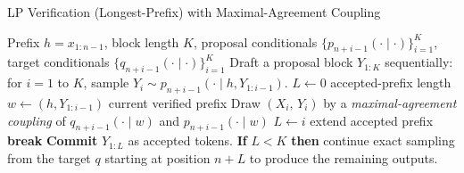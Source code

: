 \begin{algorithm}[t]
\caption{LP Verification (Longest-Prefix) with Maximal-Agreement Coupling}
\label{alg:lp-verification}
\begin{algorithmic}[1]
\Require Prefix $h=x_{1:n-1}$, block length $K$, proposal conditionals $\{p_{n+i-1}(\cdot\mid \cdot)\}_{i=1}^K$, target conditionals $\{q_{n+i-1}(\cdot\mid \cdot)\}_{i=1}^K$
\State Draft a proposal block $Y_{1:K}$ sequentially: for $i=1$ to $K$, sample $Y_i\sim p_{n+i-1}(\cdot\mid h, Y_{1:i-1})$.
\State $L\gets 0$ \Comment accepted-prefix length
  \State $w\gets (h, Y_{1:i-1})$ \Comment current verified prefix
  \State Draw $(X_i,\,Y_i)$ by a \emph{maximal-agreement coupling} of $q_{n+i-1}(\cdot\mid w)$ and $p_{n+i-1}(\cdot\mid w)$
     \State $L\gets i$ \Comment extend accepted prefix
  \Else
     \State \textbf{break}
  \EndIf
\EndFor
\State \textbf{Commit} $Y_{1:L}$ as accepted tokens.
\State \textbf{If} $L<K$ \textbf{then} continue exact sampling from the target $q$ starting at position $n+L$ to produce the remaining outputs.
\end{algorithmic}
\end{algorithm}
